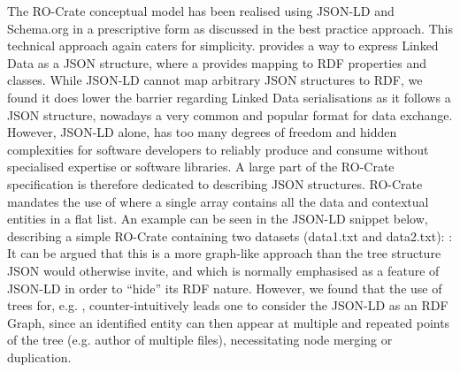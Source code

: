 \markdownRendererInterblockSeparator
{}The RO-Crate conceptual model has been realised using JSON-LD and Schema.org in a prescriptive form as discussed in the best practice approach. This technical approach again caters for simplicity. \markdownRendererInterblockSeparator
{} provides a way to express Linked Data as a JSON structure, where a  provides mapping to RDF properties and classes. While JSON-LD cannot map arbitrary JSON structures to RDF, we found it does lower the barrier regarding Linked Data serialisations as it follows a JSON structure, nowadays a very common and popular format for data exchange.\markdownRendererInterblockSeparator
{}However, JSON-LD alone, has too many degrees of freedom and hidden complexities for software developers to reliably produce and consume without specialised expertise or software libraries. A large part of the RO-Crate specification is therefore dedicated to describing JSON structures. \markdownRendererInterblockSeparator
{}\markdownRendererInterblockSeparator
{}RO-Crate mandates the use of  where a single  array contains all the data and contextual entities in a flat list. An example can be seen in the JSON-LD snippet below, describing a simple RO-Crate containing two datasets (data1.txt and data2.txt):\markdownRendererInterblockSeparator
{}\markdownRendererInterblockSeparator
{}: \markdownRendererInterblockSeparator
{}It can be argued that this is a more graph-like approach than the tree structure JSON would otherwise invite, and which is normally emphasised as a feature of JSON-LD in order to “hide” its RDF nature. \markdownRendererInterblockSeparator
{}However, we found that the use of trees for, e.g. , counter-intuitively leads one to consider the JSON-LD as an RDF Graph, since an identified  entity can then appear at multiple and repeated points of the tree (e.g. author of multiple files), necessitating node merging or duplication. \markdownRendererInterblockSeparator
